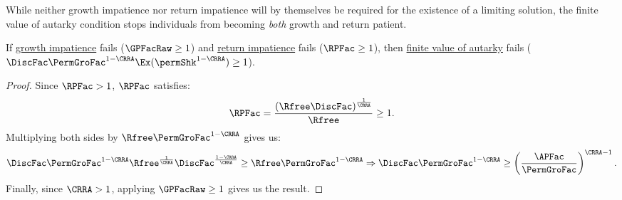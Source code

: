 \documentclass[BufferStockTheory]{subfiles}
\begin{document}
\begin{comment}
below stuff goes in growth section.
Strong growth impatience guarantees that the \textit{expectation} of normalized market resources becomes less than one market resources limit to infinity, since the condition will imply $\min \{\Ex\frac{\APFac}{\Rnd{\PermGroFac}}, \Ex\frac{R}{\Rnd{\PermGroFac}}\}< \GPFacMod<1$.


The growth impatience condition relates the \textit{expected} growth factor of permanent income to the \hyperlink{APFac}{absolute patience factor}.
Following the discussion below Assumption \ref{ass:RIC}, the growth factor of the ratio of expected market resources to expected permanent income as $m$ limits to infinity becomes $\min \{\frac{\APFac}{\PermGroFac}, \frac{R}{\PermGroFac}\}$, and we have $\min \{\frac{\APFac}{\PermGroFac}, \frac{R}{\PermGroFac}\}< \GPFacRaw$.
Thus, growth impatience ensures the ratio of \textit{expected} market resources to \textit{expected} permanent income eventually falls as $\mNrm$ grows.
\end{comment}

While neither growth impatience nor return impatience will by themselves be required for the existence of a limiting solution, the finite value of autarky condition stops individuals from becoming \textit{both} growth and return patient.

\begin{claim}\label{claim:noRICGIC}
If \hyperlink{GIC}{growth impatience} fails ($\GPFacRaw  \geq 1$) and \hyperlink{RIC}{return impatience} fails ($\RPFac \geq 1$), then \hyperlink{FVAC}{finite value of autarky} fails ($\DiscFac \PermGroFac^{1-\CRRA}\Ex(\permShk^{1-\CRRA})\geq 1$). 
\end{claim}

\begin{proof}
Since $\RPFac  > 1$, $\RPFac $ satisfies:
%
%
\begin{equation}
\RPFac = \frac{\left(\Rfree\DiscFac\right)^{\frac{1}{\CRRA}}}{\Rfree}\geq 1.
\end{equation}
%
Multiplying both sides by $\Rfree\PermGroFac^{1-\CRRA}$ gives us:
%
\begin{equation}
\DiscFac\PermGroFac^{1-\CRRA}\Rfree^{\frac{1}{\CRRA}}\DiscFac^{\frac{1-\CRRA}{\CRRA}}{}\geq\Rfree \PermGroFac^{1-\CRRA} \Rightarrow \DiscFac\PermGroFac^{1-\CRRA}\geq\left(\frac{\APFac}{\PermGroFac}\right)^{\CRRA-1}.
\end{equation}
%
Finally, since $\CRRA>1$, applying $\GPFacRaw  \geq 1$ gives us the result.

\end{proof}
\end{document}
